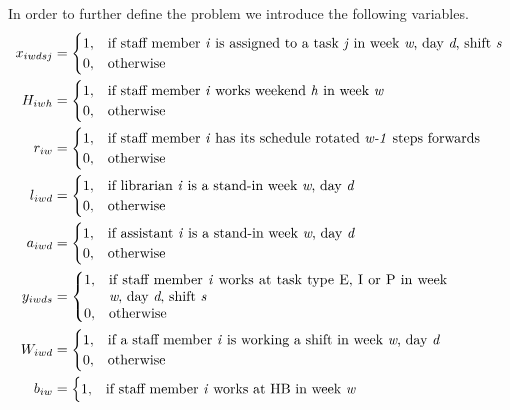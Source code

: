 In order to further define the problem we introduce the following variables.
\begin{align}
    x_{iwdsj}&=
    \begin{cases}
      1, & \text{if staff member \textit{i} is assigned to a task \textit{j} in week \textit{w}, day \textit{d}, shift \textit{s}}\\
      0, & \text{otherwise}
    \end{cases}
    \\
    H_{iwh}&=
    \begin{cases}
      1, & \text{if staff member \textit{i} works weekend \textit{h} in week \textit{w}}\\
      0, & \text{otherwise}
    \end{cases}
	\\
	r_{iw}&=
	\begin{cases}
		1, & \text{if staff member \textit{i} has its schedule rotated \textit{w-1} steps forwards}\\
		0, & \text{otherwise}
	\end{cases}
	\\
	l_{iwd}&=
	\begin{cases}
	  1, & \text{if librarian \textit{i} is a stand-in week \textit{w}, day \textit{d}} \\
	  0, & \text{otherwise}
	\end{cases}
	\\
	a_{iwd}&=
	\begin{cases}
 		1, & \text{if assistant \textit{i} is a stand-in week \textit{w}, day \textit{d}} \\
 		0, & \text{otherwise}
	\end{cases}
	\\
	y_{iwds}&=
	\begin{cases}
 		1, & 
 		\parbox[t]{.7\textwidth}{if staff member \textit{i} works at task type E, I or P in week \textit{w}, day \textit{d}, shift \textit{s}} \\
 		0, & \text{otherwise}
	\end{cases}
	\\
	W_{iwd}&=
	\begin{cases}
	 	1, & \text{if a staff member \textit{i} is working a shift in week \textit{w}, day \textit{d}} \\
	 	0, & \text{otherwise}
	\end{cases}
	\\
	b_{iw}&=
	\begin{cases}
 		1, & \text{if staff member \textit{i} works at HB in week \textit{w}} \\

\end{cases}
\end{align}
